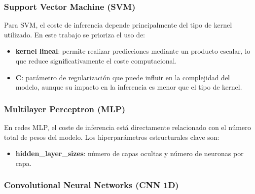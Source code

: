 \subsubsection{Support Vector Machine (SVM)}

Para SVM, el coste de inferencia depende principalmente del tipo de kernel utilizado. En este trabajo se prioriza el uso de:

\begin{itemize}
    \item \textbf{kernel lineal}: permite realizar predicciones mediante un producto escalar, lo que reduce significativamente el coste computacional.
    \item \textbf{C}: parámetro de regularización que puede influir en la complejidad del modelo, aunque su impacto en la inferencia es menor que el tipo de kernel.
\end{itemize}

\subsubsection{Multilayer Perceptron (MLP)}

En redes MLP, el coste de inferencia está directamente relacionado con el número total de pesos del modelo. Los hiperparámetros estructurales clave son:

\begin{itemize}
    \item \textbf{hidden\_layer\_sizes}: número de capas ocultas y número de neuronas por capa.
\end{itemize}





\subsubsection{Convolutional Neural Networks (CNN 1D)}

